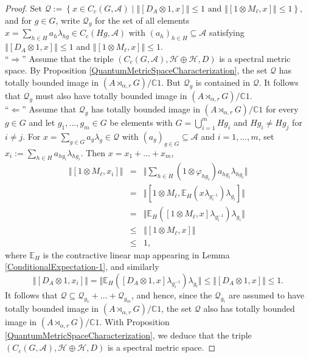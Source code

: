 \documentclass[a4paper,11pt,reqno]{amsart}
\numberwithin{equation}{section}
\numberwithin{equation}{section}
\theoremstyle{definition}
\theoremstyle{remark}
\theoremstyle{remark}
\begin{document}
\begin{proof} Set $\mathcal{Q}:=\left\{ x\in C_{c}(G,\mathcal{A})\mid\left\Vert [D_{A}\otimes1,x]\right\Vert \leq1\text{ and }\left\Vert [1\otimes M_{\ell},x]\right\Vert \leq1\right\} $,
and for $g\in G$, write $\mathcal{Q}_{g}$ for the set of all elements
$x=\sum_{h\in H}a_{h}\lambda_{hg}\in C_{c}(Hg,\mathcal{A})$ with
$(a_{h})_{h\in H}\subseteq\mathcal{A}$ satisfying $\left\Vert [D_{A}\otimes1,x]\right\Vert \leq1$
and $\left\Vert [1\otimes M_{\ell},x]\right\Vert \leq1$. \\

``$\Rightarrow$'' Assume that the triple $(C_{c}(G,\mathcal{A}),\mathcal{H}\oplus\mathcal{H},D)$
is a spectral metric space. By Proposition \ref{QuantumMetricSpaceCharacterization},
the set $\mathcal{Q}$ has totally bounded image in $(A\rtimes_{\alpha,r}G)/\mathbb{C}1$.
But $\mathcal{Q}_{g}$ is contained in $\mathcal{Q}$. It follows
that $\mathcal{Q}_{g}$ must also have totally bounded image in $(A\rtimes_{\alpha,r}G)/\mathbb{C}1$.
\\

``$\Leftarrow$'' Assume that $\mathcal{Q}_{g}$ has totally bounded
image in $(A\rtimes_{\alpha,r}G)/\mathbb{C}1$ for every $g\in G$
and let $g_{1},...,g_{m}\in G$ be elements with $G=\bigcup_{i=1}^{m}Hg_{i}$
and $Hg_{i}\neq Hg_{j}$ for $i\neq j$. For $x=\sum_{g\in G}a_{g}\lambda_{g}\in\mathcal{Q}$
with $(a_{g})_{g\in G}\subseteq\mathcal{A}$ and $i=1,...,m$, set
$x_{i}:=\sum_{h\in H}a_{hg_{i}}\lambda_{hg_{i}}$. Then $x=x_{1}+...+x_{m}$,
\begin{eqnarray*}
\left\Vert [1\otimes M_{\ell},x_{i}]\right\Vert  & = & \Vert\sum_{h\in H}(1\otimes\varphi_{hg_{i}})a_{hg_{i}}\lambda_{hg_{i}}\Vert\\
&=& \Vert[1\otimes M_{\ell},\mathbb{E}_{H}(x\lambda_{g_{i}^{-1}})\lambda_{g_{i}}]\Vert \\
 & = & \Vert\mathbb{E}_{H}([1\otimes M_{\ell},x]\lambda_{g_{i}^{-1}})\lambda_{g_{i}}\Vert\\
 & \leq & \left\Vert [1\otimes M_{\ell},x]\right\Vert \\
 & \leq & 1,
\end{eqnarray*}
where $\mathbb{E}_{H}$ is the contractive linear map appearing in
Lemma \ref{ConditionalExpectation-1}, and similarly
\[
\left\Vert [D_{A}\otimes1,x_{i}]\right\Vert =\Vert\mathbb{E}_{H}([D_{A}\otimes1,x]\lambda_{g_{i}^{-1}})\lambda_{g_{i}}\Vert\leq\Vert[D_{A}\otimes1,x]\Vert\leq1.
\]
It follows that $\mathcal{Q}\subseteq\mathcal{Q}_{g_{1}}+...+\mathcal{Q}_{g_{m}}$,
and hence, since the $\mathcal{Q}_{g_{i}}$ are assumed to have totally
bounded image in $(A\rtimes_{\alpha,r}G)/\mathbb{C}1$, the set $\mathcal{Q}$
also has totally bounded image in $(A\rtimes_{\alpha,r}G)/\mathbb{C}1$.
With Proposition \ref{QuantumMetricSpaceCharacterization}, we deduce
that the triple $(C_{c}(G,\mathcal{A}),\mathcal{H}\oplus\mathcal{H},D)$
is a spectral metric space. \end{proof}
\end{document}
